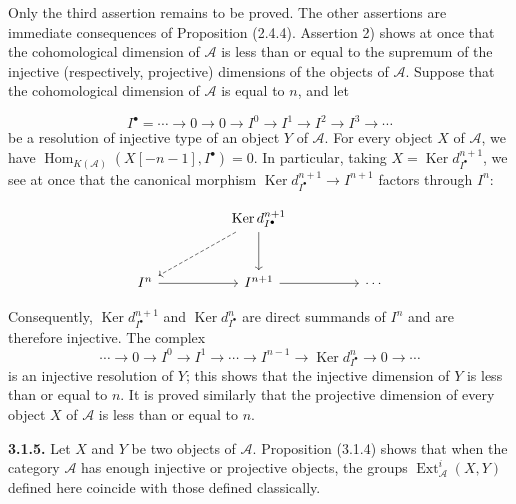 \clearpage
{}%
\begingroup\small\setlength{\parskip}{0pt}\setlength{\emergencystretch}{1.5em}
\setlength{\abovedisplayskip}{4pt plus 2pt minus 2pt}%
\setlength{\belowdisplayskip}{4pt plus 2pt minus 2pt}%

Only the third assertion remains to be proved. The other assertions are
immediate consequences of Proposition (2.4.4). Assertion 2) shows at once
that the cohomological dimension of $\mathcal A$ is less than or equal to
the supremum of the injective (respectively, projective) dimensions of the
objects of $\mathcal A$. Suppose that the cohomological dimension of
$\mathcal A$ is equal to $n$, and let

\[
I^\bullet=\cdots\longrightarrow0\longrightarrow0\longrightarrow I^0
\longrightarrow I^1\longrightarrow I^2\longrightarrow I^3
\longrightarrow\cdots
\]
be a resolution of injective type of an object $Y$ of $\mathcal A$. For every
object $X$ of $\mathcal A$, we have
$\operatorname{Hom}_{K(\mathcal A)}(X[-n-1],I^\bullet)=0$. In particular,
taking $X=\operatorname{Ker}d_{I^\bullet}^{n+1}$, we see at once that the
canonical morphism
$\operatorname{Ker}d_{I^\bullet}^{n+1}\longrightarrow I^{n+1}$ factors
through $I^n$:

\[
\begin{tikzcd}[column sep=4.8em,row sep=2.8em]
{} & \operatorname{Ker}d_{I^\bullet}^{n+1}
  \arrow[dl,dashed] \arrow[d] & {} \\
I^n \arrow[r] & I^{n+1} \arrow[r] & \cdots
\end{tikzcd}
\]

Consequently, $\operatorname{Ker}d_{I^\bullet}^{n+1}$ and
$\operatorname{Ker}d_{I^\bullet}^{n}$ are direct summands of $I^n$ and are
therefore injective. The complex
\[
\cdots\longrightarrow0\longrightarrow I^0\longrightarrow I^1
\longrightarrow\cdots\longrightarrow I^{n-1}
\longrightarrow\operatorname{Ker}d_{I^\bullet}^{n}
\longrightarrow0\longrightarrow\cdots
\]
is an injective resolution of $Y$; this shows that the injective dimension of
$Y$ is less than or equal to $n$. It is proved similarly that the projective
dimension of every object $X$ of $\mathcal A$ is less than or equal to $n$.

\medskip\noindent\textbf{3.1.5.}\quad
Let $X$ and $Y$ be two objects of $\mathcal A$. Proposition (3.1.4) shows
that when the category $\mathcal A$ has enough injective or projective
objects, the groups $\operatorname{Ext}_{\mathcal A}^{i}(X,Y)$ defined here
coincide with those defined classically.

